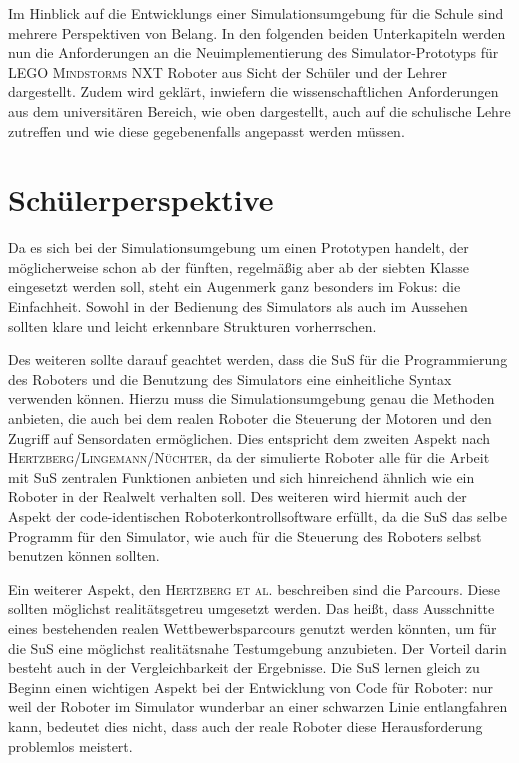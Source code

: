 \documentclass[paper=a4, pagesize, DIV=calc, BCOR=15.5mm, twoside=on, onecolumn=on, open = right, titlepage =on, parskip =half-, headsepline = on, footsepline = on, chapterprefix = on, appendixprefix = off, fontsize = 12pt, numbers = noenddot, abstract = on]{scrbook}
\numberwithin{equation}{chapter}
\theoremstyle{definition}
\theoremstyle{plain}
\theoremstyle{plain}
\theoremstyle{remark}
\theoremstyle{plain}
\theoremstyle{plain}
\begin{document}
Im Hinblick auf die Entwicklungs einer Simulationsumgebung für die Schule sind mehrere Perspektiven von Belang. 
In den folgenden beiden Unterkapiteln werden nun die Anforderungen an die Neuimplementierung des Simulator-Prototyps für \textsc{LEGO Mindstorms} NXT Roboter aus Sicht der Schüler und der Lehrer dargestellt. Zudem wird geklärt, inwiefern die wissenschaftlichen Anforderungen aus dem universitären Bereich, wie oben dargestellt, auch auf die schulische Lehre zutreffen und wie diese gegebenenfalls angepasst werden müssen.

\par \singlespacing
\section{Schülerperspektive}
\label{sec:schüler}
\onehalfspacing

Da es sich bei der Simulationsumgebung um einen Prototypen handelt, der möglicherweise schon ab der fünften, regelmäßig aber ab der siebten Klasse eingesetzt werden soll, steht ein Augenmerk ganz besonders im Fokus: die Einfachheit. Sowohl in der Bedienung des Simulators als auch im Aussehen sollten klare und leicht erkennbare Strukturen vorherrschen.

Des weiteren sollte darauf geachtet werden, dass die SuS für die Programmierung des Roboters und die Benutzung des Simulators eine einheitliche Syntax verwenden können. Hierzu muss die Simulationsumgebung genau die Methoden anbieten, die auch bei dem realen Roboter die Steuerung der Motoren und den Zugriff auf Sensordaten ermöglichen. Dies entspricht dem zweiten Aspekt nach \textsc{Hertzberg/Lingemann/Nüchter}, da der simulierte Roboter alle für die Arbeit mit SuS zentralen Funktionen anbieten und sich hinreichend ähnlich wie ein Roboter in der Realwelt verhalten soll. Des weiteren wird hiermit auch der Aspekt der code-identischen Roboterkontrollsoftware erfüllt, da die SuS das selbe Programm für den Simulator, wie auch für die Steuerung des Roboters selbst benutzen können sollten.

Ein weiterer Aspekt, den \textsc{Hertzberg et al.} beschreiben sind die Parcours. Diese sollten möglichst realitätsgetreu umgesetzt werden. Das heißt, dass Ausschnitte eines bestehenden realen Wettbewerbsparcours genutzt werden könnten, um für die SuS eine möglichst realitätsnahe Testumgebung anzubieten. Der Vorteil darin besteht auch in der Vergleichbarkeit der Ergebnisse. Die SuS lernen gleich zu Beginn einen wichtigen Aspekt bei der Entwicklung von Code für Roboter: nur weil der Roboter im Simulator wunderbar an einer schwarzen Linie entlangfahren kann, bedeutet dies nicht, dass auch der reale Roboter diese Herausforderung problemlos meistert.
\end{document}

